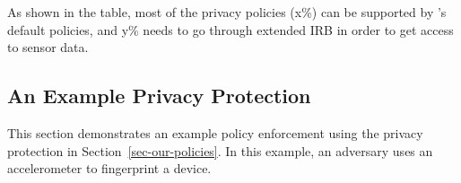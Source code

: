 As shown in the table, most of the privacy policies (x\%) can be supported by
\sysname's default policies, and y\% needs to go through extended IRB in order
to get access to sensor data. 


\begin{comment}
As another example, prior work shows 
that Android users' touch inputs can be revealed through a few attack 
techniques like keyloggers and fingerprinting. 
User generated data thus can be informative enough 
for malware to infer the key the user enters~\cite{cai2011touchlogger, 
owusu2012accessory}, or to fingerprint and identify individual 
devices~\cite{bojinov2014mobile, dey2014accelprint}. Because these 
motion sensors are accessible 
without requesting any 
permissions or notifying the device owner, these attack techniques are much 
less detectable. However, the chance for these techniques to succeed
depends on their sampling rate. 
Therefore, the policies to restrict the access rates to motion sensors 
are effective when the allowed rate is lower than the best keylogger 
would require to identify a key, or the best tracker to fingerprint a device.
Section~\ref{sec-experiment} shows such an example. 
\end{comment}



\subsection{An Example Privacy Protection}\label{sec-experiment}

This section demonstrates an example policy enforcement using the 
privacy protection in Section~\ref{sec-our-policies}. In this example, an 
adversary uses an accelerometer to fingerprint a device. 



